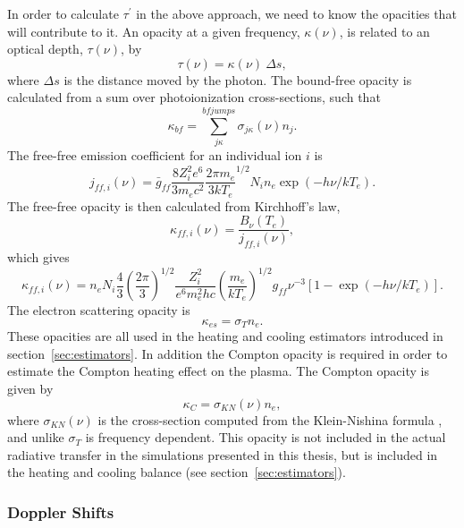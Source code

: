 In order to calculate $\tau^\prime$ in the above approach, we need
to know the opacities that will contribute to it. An opacity 
at a given frequency, $\kappa(\nu)$,
is related to an optical depth, $\tau(\nu)$, by
\begin{equation}
\tau(\nu) = \kappa(\nu)~\Delta s,
\end{equation}
where $\Delta s$ is the distance moved by the photon. The bound-free
opacity is calculated from a sum over photoionization cross-sections,
such that
\begin{equation}
\kappa_{bf} = \sum_{j\kappa}^{bfjumps} \sigma_{j\kappa} (\nu) n_j.
\end{equation}
The free-free emission coefficient for an individual ion $i$ is \citep{gayet1970}
\begin{equation}
j_{ff,i} (\nu) = \bar{g}_{ff}\frac{8Z_i^2e^6}{3m_e c^2}
\frac{2\pi m_e}{3 k T_e}^{1/2}
N_i n_e \exp(-h\nu/kT_e).
\label{eq:jff} 
\end{equation}
The free-free opacity is then calculated from Kirchhoff's law, 
\begin{equation}
\kappa_{ff, i}(\nu) = \frac{B_\nu (T_e)}{j_{ff,i} (\nu)},
\end{equation}
which gives
\begin{equation}
\kappa_{ff, i}(\nu) = n_e N_i \frac{4}{3} \left(\frac{2\pi}{3}\right)^{1/2} 
\frac{Z_i^2}{e^6 m_e^2 hc} \left(\frac{m_e}{kT_e}\right)^{1/2} 
g_{ff} \nu^{-3} [1 - \exp(-h\nu/kT_e)].
\end{equation}
The electron scattering opacity is 
\begin{equation}
\kappa_{es} = \sigma_T n_e.
\end{equation}
These opacities are all used in the heating and cooling estimators 
introduced in section~\ref{sec:estimators}. In addition the
Compton opacity is required in order to estimate the Compton heating effect on the plasma.
The Compton opacity is given by
\begin{equation}
\kappa_{C} = \sigma_{KN} (\nu) n_e,
\end{equation}
where $\sigma_{KN} (\nu)$ is the cross-section computed 
from the Klein-Nishina formula \citep{klein-nishina}, and unlike $\sigma_T$
is frequency dependent. This opacity is not included in the actual radiative transfer 
in the simulations presented in this thesis, but is included in the heating and 
cooling balance (see section~\ref{sec:estimators}).

\subsubsection{Doppler Shifts}


